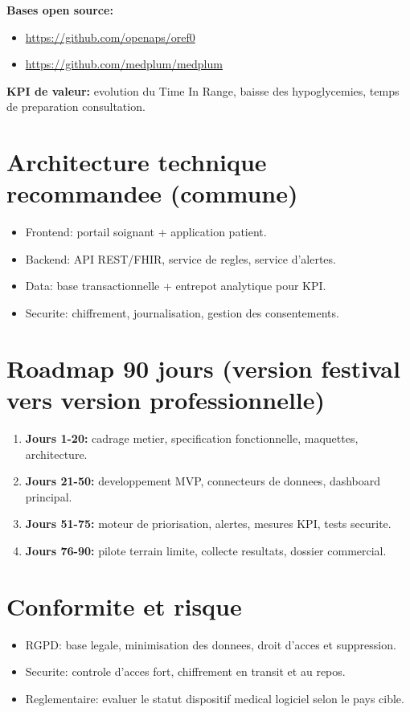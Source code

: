 \documentclass[11pt,a4paper]{article}
\begin{document}
\textbf{Bases open source:}
\begin{itemize}[leftmargin=*]
  \item \url{https://github.com/openaps/oref0}
  \item \url{https://github.com/medplum/medplum}
\end{itemize}

\textbf{KPI de valeur:} evolution du Time In Range, baisse des hypoglycemies, temps de preparation consultation.

\section*{Architecture technique recommandee (commune)}
\begin{itemize}[leftmargin=*]
  \item Frontend: portail soignant + application patient.
  \item Backend: API REST/FHIR, service de regles, service d'alertes.
  \item Data: base transactionnelle + entrepot analytique pour KPI.
  \item Securite: chiffrement, journalisation, gestion des consentements.
\end{itemize}

\section*{Roadmap 90 jours (version festival vers version professionnelle)}
\begin{enumerate}[leftmargin=*]
  \item \textbf{Jours 1-20:} cadrage metier, specification fonctionnelle, maquettes, architecture.
  \item \textbf{Jours 21-50:} developpement MVP, connecteurs de donnees, dashboard principal.
  \item \textbf{Jours 51-75:} moteur de priorisation, alertes, mesures KPI, tests securite.
  \item \textbf{Jours 76-90:} pilote terrain limite, collecte resultats, dossier commercial.
\end{enumerate}

\section*{Conformite et risque}
\begin{itemize}[leftmargin=*]
  \item RGPD: base legale, minimisation des donnees, droit d'acces et suppression.
  \item Securite: controle d'acces fort, chiffrement en transit et au repos.
  \item Reglementaire: evaluer le statut dispositif medical logiciel selon le pays cible.
\end{itemize}
\end{document}
